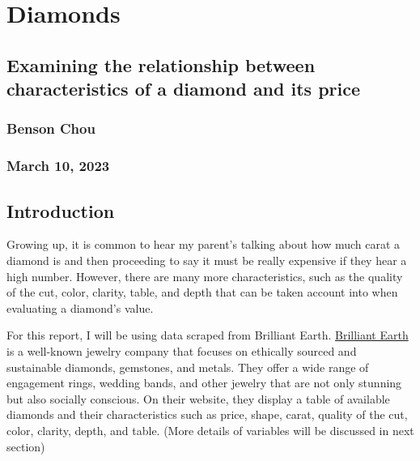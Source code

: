\documentclass[
]{article}
\author{}
\date{\vspace{-2.5em}}
\begin{document}
\hypertarget{diamonds}{%
\section{Diamonds}\label{diamonds}}

\hypertarget{examining-the-relationship-between-characteristics-of-a-diamond-and-its-price}{%
\subsection{Examining the relationship between characteristics of a
diamond and its
price}\label{examining-the-relationship-between-characteristics-of-a-diamond-and-its-price}}

\hypertarget{benson-chou}{%
\subsubsection{Benson Chou}\label{benson-chou}}

\hypertarget{march-10-2023}{%
\subsubsection{March 10, 2023}\label{march-10-2023}}

\hypertarget{introduction}{%
\subsection{Introduction}\label{introduction}}

Growing up, it is common to hear my parent's talking about how much
carat a diamond is and then proceeding to say it must be really
expensive if they hear a high number. However, there are many more
characteristics, such as the quality of the cut, color, clarity, table,
and depth that can be taken account into when evaluating a diamond's
value.

For this report, I will be using data scraped from Brilliant Earth.
\href{https://www.brilliantearth.com/}{Brilliant Earth} is a well-known
jewelry company that focuses on ethically sourced and sustainable
diamonds, gemstones, and metals. They offer a wide range of engagement
rings, wedding bands, and other jewelry that are not only stunning but
also socially conscious. On their website, they display a table of
available diamonds and their characteristics such as price, shape,
carat, quality of the cut, color, clarity, depth, and table. (More
details of variables will be discussed in next section)
\end{document}
